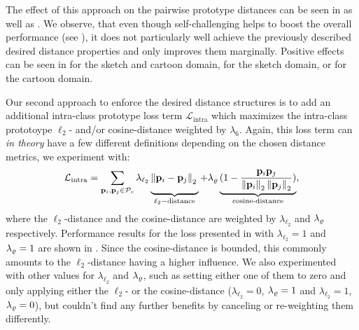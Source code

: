 The effect of this approach on the pairwise prototype distances can be seen in  as well as . We observe, that even though self-challenging helps to boost the overall performance (see ), it does not particularly well achieve the previously described desired distance properties and only improves them marginally. Positive effects can be seen in  for the sketch and cartoon domain,  for the sketch domain, or  for the cartoon domain.

Our second approach to enforce the desired distance structures is to add an additional intra-class prototype loss term $\mathcal{L}_\mathrm{intra}$ which maximizes the intra-class prototoype $\ell_2$- and/or cosine-distance weighted by $\lambda_6$. Again, this loss term can \emph{in theory} have a few different definitions depending on the chosen distance metrics, we experiment with: 
\begin{equation}
\label{eq:intra_loss}
    \mathcal{L}_\mathrm{intra} = \sum_{\proti_i, \prot \in \prots_c} \lambda_{\ell_2} \underbrace{\left\|\proti_i - \prot  \right\|_2 \vphantom{\frac{\proti_i\prot}{\left\|\proti_i \right\|_2 \left\|\prot \right\|_2}}}_{\ell_2-\text{distance}} + \lambda_{\cdistance} \underbrace{ (1-\frac{\proti_i\prot}{\left\|\proti_i \right\|_2 \left\|\prot \right\|_2})}_{\text{cosine-distance}},
\end{equation}
where the $\ell_2$-distance and the cosine-distance are weighted by $\lambda_{\ell_2}$ and $\lambda_{\varrho}$ respectively. Performance results for the loss presented in  with $\lambda_{\ell_2} = 1$ and $\lambda_{\varrho} = 1$ are shown in . Since the cosine-distance is bounded, this commonly amounts to the $\ell_2$-distance having a higher influence. We also experimented with other values for $\lambda_{\ell_2}$ and $\lambda_{\varrho}$, such as setting either one of them to zero and only applying either the $\ell_2$- or the cosine-distance ($\lambda_{\ell_2} = 0$, $\lambda_{\varrho} = 1$ and $\lambda_{\ell_2} = 1$, $\lambda_{\varrho} = 0$), but couldn't find any further benefits by canceling or re-weighting them differently. 

